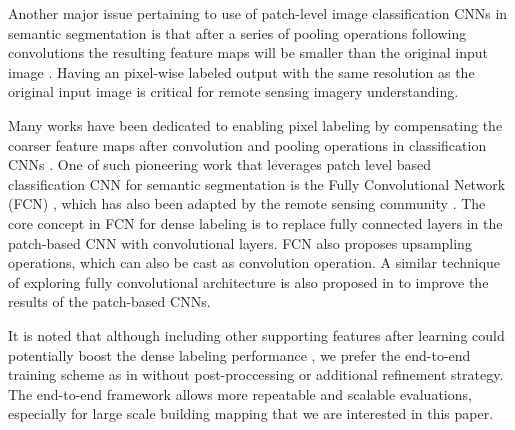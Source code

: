 \documentclass[journal]{IEEEtran}
\begin{document}
Another major issue pertaining to use of patch-level image classification CNNs in semantic segmentation is that after a series of pooling operations following convolutions the resulting feature maps will be smaller than the original input image \cite{Goodfellow2016}. Having an pixel-wise labeled output with the same resolution as the original input image is critical for remote sensing imagery understanding. 

Many works have been dedicated to enabling pixel labeling by compensating the coarser feature maps after convolution and pooling operations in classification CNNs \cite{NoordPostma2017}. One of such pioneering work that leverages patch level based classification CNN for semantic segmentation is the Fully Convolutional Network (FCN) \cite{ShelhamerLongDarrell2017}, which has also been adapted by the remote sensing community \cite{Sherrah2016}. The core concept in FCN for dense labeling is to replace fully connected layers in the patch-based CNN with convolutional layers. FCN also proposes upsampling operations, which can also be cast as convolution operation. A similar technique of exploring fully convolutional architecture is also proposed in \cite{Maggiori2016} to improve the results of the patch-based CNNs. 

It is noted that although including other supporting features after learning could potentially boost the dense labeling performance \cite{PaisitkriangkraiSherrahJanneyEtAl2016}, we prefer the end-to-end training scheme as in \cite{Yuan2018,ShelhamerLongDarrell2017,Maggiori2016,VolpiTuia2017} without post-proccessing or additional refinement strategy. The end-to-end framework allows more repeatable and scalable evaluations, especially for large scale building mapping that we are interested in this paper.
\end{document}
